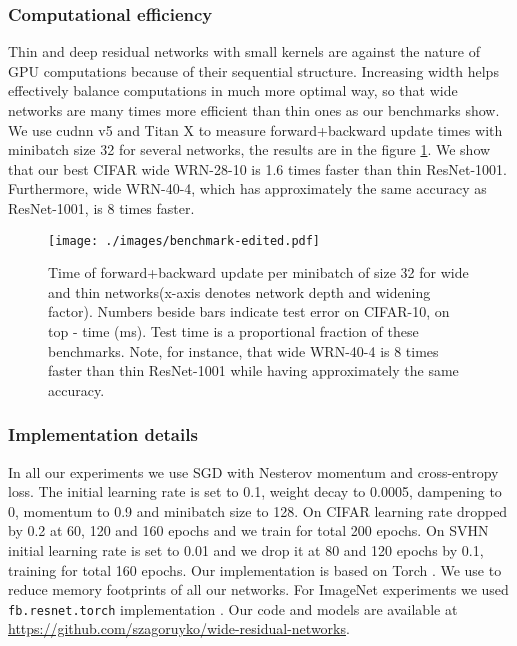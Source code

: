 \documentclass{bmvc2k}
\begin{document}
{\subsubsection*{Computational efficiency} Thin and deep residual networks with small kernels are against the nature of GPU computations because of their sequential structure. Increasing width helps effectively balance computations in much more optimal way, so that wide networks are many times more efficient than thin ones as our benchmarks show. We use cudnn v5 and Titan X to measure forward+backward update times with minibatch size 32 for several networks, the results are in the figure \ref{fig:benchmark}. We show that our best CIFAR wide WRN-28-10 is 1.6 times faster than thin ResNet-1001. Furthermore, wide WRN-40-4, which has  approximately the same accuracy as ResNet-1001, is 8 times faster.

\begin{figure}[h]
  \centering
  \texttt{[image: ./images/benchmark-edited.pdf]}
  \caption{Time of forward+backward update per minibatch of size 32 for wide and thin networks(x-axis denotes network depth and widening factor). Numbers beside bars indicate test error on CIFAR-10, on top - time (ms). Test time is a proportional fraction of these benchmarks. Note, for instance, that wide WRN-40-4 is 8 times faster than thin ResNet-1001 while having approximately the same accuracy.
}
  \vspace{-0.2cm}
  \label{fig:benchmark}
\end{figure}


\subsubsection*{Implementation details} In all our experiments we use SGD with Nesterov momentum and cross-entropy loss. The initial learning rate is set to 0.1, weight decay to 0.0005, dampening to 0, momentum to 0.9 and minibatch size to 128. On CIFAR learning rate dropped by 0.2 at 60, 120 and 160 epochs and we train for total 200 epochs. On SVHN initial learning rate is set to 0.01 and we drop it at 80 and 120 epochs by 0.1, training for total 160 epochs. Our implementation is based on Torch \cite{torch}. We use \cite{optimize-net} to reduce memory footprints of all our networks. For ImageNet experiments we used \texttt{fb.resnet.torch} implementation \cite{fb.resnet.torch}. Our code and models are available at \url{https://github.com/szagoruyko/wide-residual-networks}.

}
\end{document}
